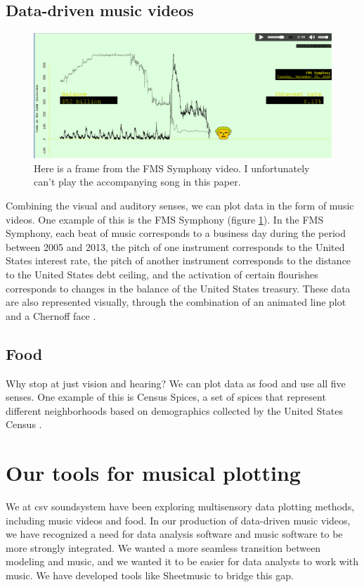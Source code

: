 \documentclass{acm_proc_article-sp}
\begin{document}
\subsection{Data-driven music videos}
\begin{figure} \label{fms}
\centering
\caption{Here is a frame from the FMS Symphony video. I unfortunately can't play the accompanying song in this paper.}
\includegraphics[width=\textwidth]{../sensory-data-experiences/fms.png}
\end{figure}

Combining the visual and auditory senses, we can plot data in the form
of music videos. One example of this is the FMS Symphony (figure \ref{fms}).
In the FMS Symphony, each beat of music corresponds to a business day
during the period between 2005 and 2013, the pitch of one instrument
corresponds to the United States interest rate, the pitch of another
instrument corresponds to the distance to the United States debt ceiling,
and the activation of certain flourishes corresponds to changes in the
balance of the United States treasury. These data are also represented
visually, through the combination of an animated line plot and a
Chernoff face \cite{fms-about}.

\subsection{Food}
Why stop at just vision and hearing? We can plot data as food and use
all five senses. One example of this is Census Spices, a set of spices
that represent different neighborhoods based on demographics collected
by the United States Census \cite{censusspices}.

\section{Our tools for musical plotting}
We at csv soundsystem have been exploring multisensory
data plotting methods, including music videos and food.
In our production of data-driven music videos, we have recognized a need
for data analysis software and music software to be more strongly integrated.
We wanted a more seamless transition between modeling and music, and we
wanted it to be easier for data analysts to work with music. We have
developed tools like Sheetmusic to bridge this gap.
\end{document}

